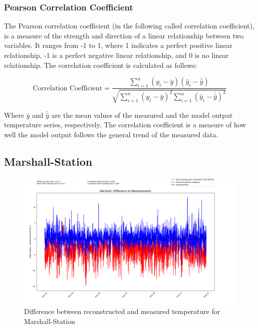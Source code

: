 \subsubsection*{Pearson Correlation Coefficient}

The Pearson correlation coefficient (in the following called correlation coefficient), is a measure of the strength and direction of a linear relationship between two variables. It ranges from -1 to 1, where 1 indicates a perfect positive linear relationship, -1 is a perfect negative linear relationship, and 0 is no linear relationship. The correlation coefficient is calculated as follows:

\begin{equation}
    \text{Correlation Coefficient} = \frac{\sum_{i=1}^{n} (y_i - \bar{y})(\hat{y}_i - \bar{\hat{y}})}{\sqrt{\sum_{i=1}^{n} (y_i - \bar{y})^2 \sum_{i=1}^{n} (\hat{y}_i - \bar{\hat{y}})^2}}
    \label{eq:correlation}
\end{equation}
    
Where $\bar{y}$ and $\bar{\hat{y}}$ are the mean values of the measured and the model output temperature series, respectively. The correlation coefficient is a measure of how well the model output follows the general trend of the measured data. \cite{Zou2003Correlation}


\subsection*{Marshall-Station}

\begin{figure}
    \centering
    \includegraphics[width=\textwidth]{resources/images/charts/marshall_eval_grib_final/Marshall, Difference to Measurements.png}
    \caption{Difference between reconstructed and measured temperature for Marshall-Station}
    \label{fig:marshall_diff}
\end{figure}

